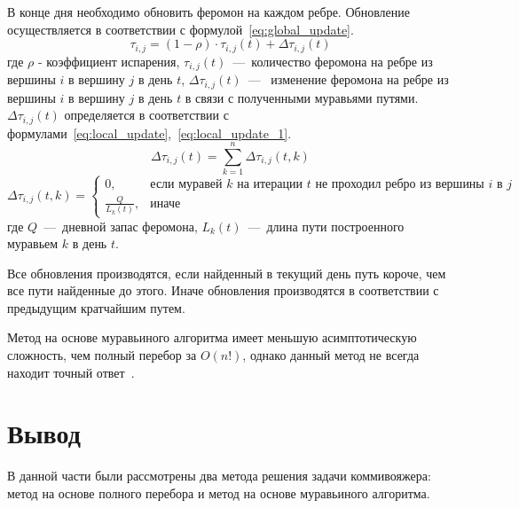 В конце дня необходимо обновить феромон на каждом ребре. Обновление осуществляется в соответствии с формулой~\ref{eq:global_update}.
\begin{equation}
	\label{eq:global_update}
	\tau_{i, j} = (1 - \rho) \cdot \tau_{i, j}(t) + \Delta \tau_{i, j}(t)
\end{equation}
где $\rho$ - коэффициент испарения, $\tau_{i, j}(t)$~---~количество феромона на ребре из вершины $i$ в вершину $j$ в день $t$, $\Delta \tau_{i, j}(t)$~---~ изменение феромона на ребре из вершины $i$ в вершину $j$ в день $t$ в связи с полученными муравьями путями.
$\Delta \tau_{i, j}(t)$ определяется в соответствии с формулами~\ref{eq:local_update},~\ref{eq:local_update_1}.
\begin{equation}
	\label{eq:local_update}
	\Delta \tau_{i, j}(t)= \displaystyle\sum_{k=1}^{n} \Delta \tau_{i, j}(t, k)
\end{equation}
\begin{equation}
	\label{eq:local_update_1}
	\Delta \tau_{i, j}(t, k) = \begin{cases}
		0, & \text{если муравей }k\text{ на итерации }t\text{ не проходил ребро из вершины }i\text{ в }j\\
		\frac{Q}{L_{k}(t)}, & \text{иначе}
	\end{cases}
\end{equation} 
где $Q$~---~дневной запас феромона, $L_{k}(t)$~---~длина пути построенного муравьем $k$ в день $t$.

Все обновления производятся, если найденный в текущий день путь короче, чем все пути найденные до этого. Иначе обновления производятся в соответствии с предыдущим кратчайшим путем.

Метод на основе муравьиного алгоритма имеет меньшую асимптотическую сложность, чем полный перебор за $O(n!)$, однако данный метод не всегда находит точный ответ~\cite{Dorigo04}.

\section*{Вывод}

В данной части были рассмотрены два метода решения задачи коммивояжера: метод на основе полного перебора и метод на основе муравьиного алгоритма.

\clearpage